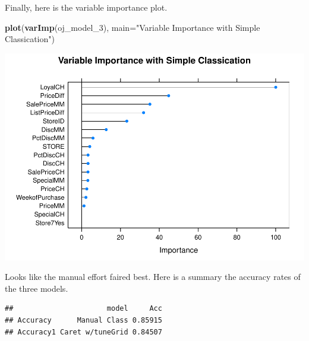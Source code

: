 \documentclass[]{book}
\newenvironment{Shaded}{\begin{snugshade}}{\end{snugshade}}
\newcommand{\DataTypeTok}[1]{\textcolor[rgb]{0.13,0.29,0.53}{#1}}
\newcommand{\DecValTok}[1]{\textcolor[rgb]{0.00,0.00,0.81}{#1}}
\newcommand{\KeywordTok}[1]{\textcolor[rgb]{0.13,0.29,0.53}{\textbf{#1}}}
\newcommand{\NormalTok}[1]{#1}
\newcommand{\OperatorTok}[1]{\textcolor[rgb]{0.81,0.36,0.00}{\textbf{#1}}}
\newcommand{\StringTok}[1]{\textcolor[rgb]{0.31,0.60,0.02}{#1}}
\begin{document}
Finally, here is the variable importance plot.

\begin{Shaded}
\begin{Highlighting}[]
\KeywordTok{plot}\NormalTok{(}\KeywordTok{varImp}\NormalTok{(oj_model_}\DecValTok{3}\NormalTok{), }\DataTypeTok{main=}\StringTok{"Variable Importance with Simple Classication"}\NormalTok{)}
\end{Highlighting}
\end{Shaded}

\includegraphics{data-sci_files/figure-latex/unnamed-chunk-57-1.pdf}

Looks like the manual effort faired best. Here is a summary the accuracy rates of the three models.

\begin{Shaded}
\end{Shaded}

\begin{verbatim}
##                      model     Acc
## Accuracy      Manual Class 0.85915
## Accuracy1 Caret w/tuneGrid 0.84507
\end{verbatim}
\end{document}
